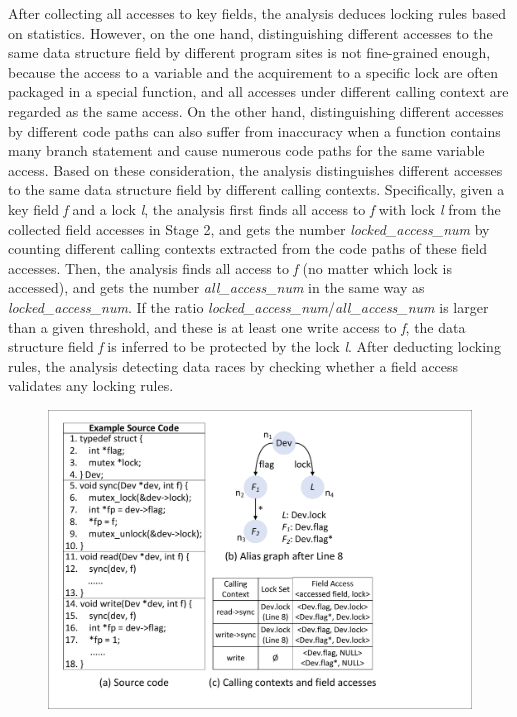  After collecting all accesses to key fields, 
the analysis deduces locking rules based on statistics. However, on the one 
hand, distinguishing different accesses to the same data structure field by 
different program sites is not fine-grained enough, because the access to a 
variable and the acquirement to a specific lock are often packaged in a special 
function, and all accesses under different calling context are regarded as the 
same access. On the other hand, distinguishing different accesses by different 
code paths can also suffer from inaccuracy when a function contains many branch 
statement and cause numerous code paths for the same variable access. Based on 
these consideration, the analysis distinguishes different accesses to the same 
data structure field by different calling contexts. Specifically, given a key 
field {\em f} and a lock {\em l}, the analysis first finds all access to {\em 
f} with lock {\em l} from the collected field accesses in Stage 2, and gets the 
number {\em locked\_access\_num} by counting different calling contexts 
extracted from the code paths of these field accesses. Then, the analysis finds 
all access to {\em f} (no matter which lock is accessed), and gets the number 
{\em all\_access\_num} in the same way as {\em locked\_access\_num}. If the 
ratio {\em locked\_access\_num}/{\em all\_access\_num} is larger than a given 
threshold, and these is at least one write access to {\em f}, the data 
structure field {\em f} is inferred to be protected by the lock {\em l}. After 
deducting locking rules, the analysis detecting data races by checking whether 
a field access validates any locking rules.

\begin{figure}[htbp]
	\centering
	\includegraphics[width=1\linewidth]{figures/fig_demo_rule_mining.pdf}
	\label{fig_demo_rule_mining}
\end{figure}

